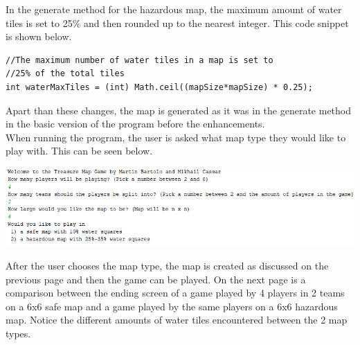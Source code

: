 \documentclass[a4paper,12pt]{extarticle}
\begin{document}
\noindent In the generate method for the hazardous map, the maximum amount of water tiles is set to 25\% and then rounded up to the nearest integer. This code snippet is shown below.

\begin{lstlisting}
//The maximum number of water tiles in a map is set to 
//25% of the total tiles
int waterMaxTiles = (int) Math.ceil((mapSize*mapSize) * 0.25);
\end{lstlisting}
\vspace{4mm}

\noindent Apart than these changes, the map is generated as it was in the generate method in the basic version of the program before the enhancements.\\

\noindent When running the program, the user is asked what map type they would like to play with. This can be seen below.

\begin{center}
\includegraphics[width=\textwidth]{Figure1.png}
\end{center}

\noindent After the user chooses the map type, the map is created as discussed on the previous page and then the game can be played. On the next page is a comparison between the ending screen of a game played by 4 players in 2 teams on a 6x6 safe map and a game played by the same players on a 6x6 hazardous map. Notice the different amounts of water tiles encountered between the 2 map types.
\newpage
\end{document}
